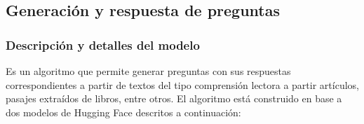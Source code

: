 \documentclass[../Main.tex]{subfiles}
\begin{document}
    \subsection{Generación y respuesta de preguntas}
    \subsubsection{Descripción y detalles del modelo}
    \begin{justify}
    Es un algoritmo que permite generar preguntas con sus respuestas correspondientes a partir de textos del tipo comprensión lectora a partir artículos, pasajes extraídos de libros, entre otros.
    El algoritmo está construido en base a dos modelos de Hugging Face descritos a continuación:
    \end{justify}
    
\end{document}
